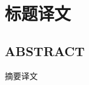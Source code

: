 \chapter[Abstract]{\linespread{1.5}\selectfont 标题译文}

\vbox{}
\section*{\qquad\qquad\qquad\qquad\qquad\quad\quad ABSTRACT}
\vbox{}

{
	\par
	\linespread{1.5}\selectfont
	摘要译文
	\par

\vbox{}
}
